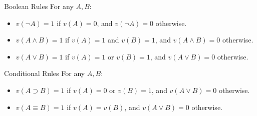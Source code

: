 \documentclass[
  17pt,
  letterpaper,
  ignorenonframetext,
  aspectratio=169,
]{beamer}
\providecommand{\tightlist}{%
  \setlength{\itemsep}{0pt}\setlength{\parskip}{0pt}}\usepackage{longtable,booktabs,array}
\begin{document}
\begin{frame}{Boolean Rules}
\protect\hypertarget{boolean-rules}{}
For any \(A, B\):

\begin{itemize}[<+->]
\tightlist
\item
  \(v(\neg A) = 1\) if \(v(A) = 0\), and \(v(\neg A) = 0\) otherwise.
\item
  \(v(A \wedge B) = 1\) if \(v(A) = 1\) and \(v(B) = 1\), and
  \(v(A \wedge B) = 0\) otherwise.
\item
  \(v(A \vee B) = 1\) if \(v(A) = 1\) or \(v(B) = 1\), and
  \(v(A \vee B) = 0\) otherwise.
\end{itemize}
\end{frame}

\begin{frame}{Conditional Rules}
\protect\hypertarget{conditional-rules}{}
For any \(A, B\):

\begin{itemize}[<+->]
\tightlist
\item
  \(v(A \supset B) = 1\) if \(v(A) = 0\) or \(v(B) = 1\), and
  \(v(A \vee B) = 0\) otherwise.
\item
  \(v(A \equiv B) = 1\) if \(v(A) = v(B)\), and \(v(A \vee B) = 0\)
  otherwise.
\end{itemize}
\end{frame}
\end{document}
